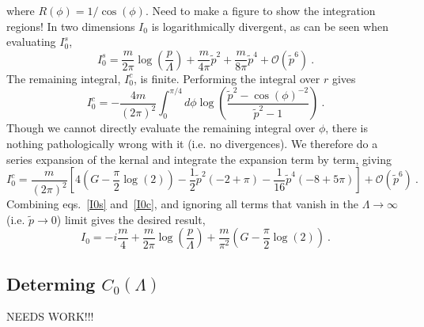 where $R(\phi)=1/\cos(\phi)$.  {\color{red}Need to make a figure to show the integration regions!}  In two dimensions $I_0$ is logarithmically divergent, as can be seen when evaluating $I_0^s$,
\begin{equation}\label{eq:I0s}
I_0^s=\frac{m}{2 \pi} \log\left(\frac{p}{\Lambda}\right)+\frac{m}{4 \pi}\tilde p^2+\frac{m}{8 \pi}\tilde p^4+\mathcal{O}(\tilde p^6)\ .
\end{equation}
The remaining integral, $I_0^c$, is finite.  Performing the integral over $r$ gives
\begin{equation}
I_0^c=-\frac{4m}{(2\pi)^2}\int_0^{\pi/4}d\phi \log\left(\frac{\tilde p^2-\cos(\phi)^{-2}}{\tilde p^2-1}\right)\ .
\end{equation}
Though we cannot directly evaluate the remaining integral over $\phi$, there is nothing pathologically wrong with it (i.e. no divergences).  We therefore do a series expansion of the kernal and integrate the expansion term by term, giving
\begin{equation}\label{eq:I0c}
I_0^c=\frac{m}{(2\pi)^2}\left[4 \left(G-\frac{\pi}{2}\log(2)\right) - \frac{1}{2} \tilde p^2 (-2 + \pi) - 
 \frac{1}{16}\tilde p^4 (-8 + 5 \pi)\right] +\mathcal{O}(\tilde p^6)\ .
\end{equation}
Combining eqs.~\eqref{I0s} and~\eqref{I0c}, and ignoring all terms that vanish in the $\Lambda\to\infty$ (i.e. $\tilde p\to 0$) limit gives the desired result,
\begin{equation}
I_0=-i \frac{m}{4}+\frac{m}{2 \pi} \log\left(\frac{p}{\Lambda}\right)+\frac{m}{\pi^2} \left(G-\frac{\pi}{2}\log(2)\right)\ .
\end{equation}

\subsection{Determing $C_0(\Lambda)$} 
NEEDS WORK!!!

